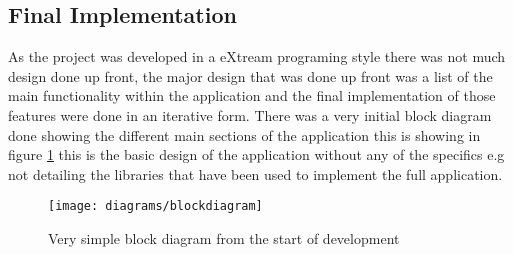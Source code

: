 \subsection{Final Implementation}

As the project was developed in a eXtream programing style there was not much design done up front, the major design that was done up front was a list of the main functionality within the application and the final implementation of those features were done in an iterative form. There was a very initial block diagram done showing the different main sections of the application this is showing in figure \ref{fig:initial_diagram_image} this is the basic design of the application without any of the specifics e.g not detailing the libraries that have been used to implement the full application.\\

\begin{figure}[H]
    \centering
    \texttt{[image: diagrams/blockdiagram]}
    \caption{Very simple block diagram from the start of development}
    \label{fig:initial_diagram_image}
\end{figure} 

